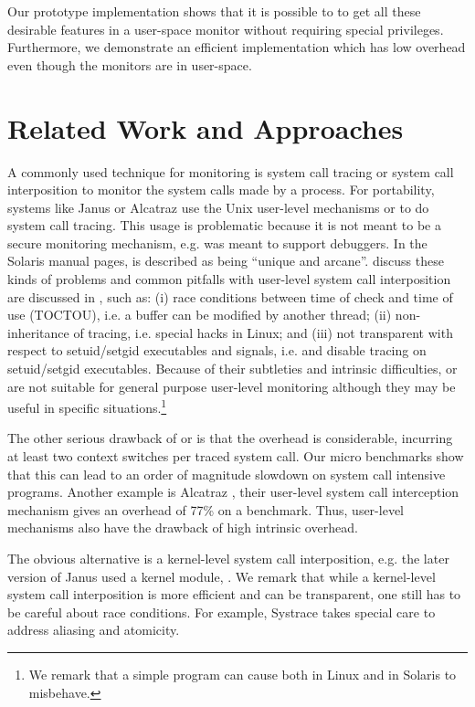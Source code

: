Our prototype implementation shows that it is possible to to get all
these desirable features in a user-space monitor without requiring special
privileges. Furthermore, we demonstrate an efficient implementation
which has low overhead even though the monitors are in user-space.

\section{Related Work and Approaches}

A commonly used technique for monitoring is system call tracing or system call
interposition to monitor the system calls made by a process.
For portability, systems like Janus \cite{janus} or Alcatraz \cite{alcatraz}
use the Unix user-level mechanisms  or  to do
system call tracing.
This usage is problematic because it is not
meant to be a secure monitoring mechanism, e.g.
 was meant to support debuggers.
In the Solaris manual pages,  is described as being
``unique and arcane''.
\cite{garfinkel} discuss 
these kinds of problems and common
pitfalls with user-level system call interposition
are discussed in \cite{garfinkel}, such as:
(i) race conditions between time of check and time of use (TOCTOU), 
i.e. a buffer can be modified by another thread;
(ii) non-inheritance of tracing, i.e. special  hacks in Linux;
and (iii) not transparent with respect to setuid/setgid executables 
and signals,
i.e.  and  disable tracing 
on setuid/setgid executables.  
Because of their subtleties and intrinsic difficulties,
 or  are not suitable for general purpose user-level
monitoring although they may be useful in specific situations.\footnote{
We remark that a simple program can cause both
 in Linux and  in Solaris to misbehave.
}

The other serious drawback of  or  is that
the overhead is considerable, incurring at least two
context switches per traced system call.
Our micro benchmarks show that this can lead to an order of magnitude
slowdown on system call intensive programs.
Another example is Alcatraz \cite{alcatraz},
their user-level system call interception mechanism gives an overhead of 77\%
on a  benchmark.
Thus, user-level mechanisms also have the drawback
of high intrinsic overhead.

The obvious alternative is a kernel-level system call interposition,
e.g. the later version of Janus used a kernel module, 
\cite{garfinkel}.
We remark that while a kernel-level system call interposition
is more efficient and can be transparent, one still has to be
careful about race conditions.
For example, Systrace \cite{systrace} takes special care to address aliasing
and atomicity.


